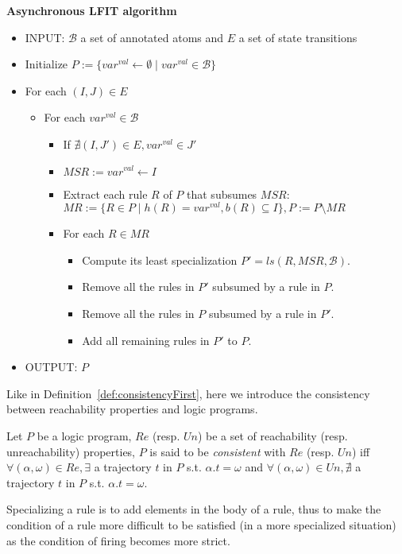 \textbf{Asynchronous LFIT algorithm}
\begin{itemize}
	\item INPUT: $\mathcal{B}$ a set of annotated atoms and $E$ a set of state transitions
	\item Initialize $P := \{var^{val} \leftarrow \emptyset \mid var^{val} \in \mathcal{B}\}$
	\item For each $(I,J) \in E$
	\begin{itemize}
		\item For each $var^{val} \in \mathcal{B}$
		\begin{itemize}
			\item If $\nexists (I,J') \in E, var^{val} \in J'$
			\item $MSR := var^{val} \leftarrow I$
			\item Extract each rule $R$ of $P$ that subsumes $MSR$: $MR := \{R \in P \mid h(R) = var^{val}, b(R) \subseteq I\}, P := P \setminus MR$
			\item For each $R \in MR$
			\begin{itemize}
				\item Compute its least specialization $P'=ls(R,MSR,\mathcal{B})$.
				\item Remove all the rules in $P'$ subsumed by a rule in $P$.
				\item Remove all the rules in $P$ subsumed by a rule in $P'$.
				\item Add all remaining rules in $P'$ to $P$.
			\end{itemize}
		\end{itemize}
	\end{itemize}
	\item OUTPUT: $P$
\end{itemize}

Like in Definition~\ref{def:consistencyFirst}, here we introduce the consistency between reachability properties and logic programs.

\begin{definition}
Let $P$ be a logic program, $Re$ (resp. $Un$) be a set of reachability (resp. unreachability) properties, $P$ is said to be {\em consistent} with $Re$ (resp. $Un$) iff
$\forall (\alpha,\omega) \in Re, \exists$ a trajectory $t$ in $P$ s.t. $\alpha.t=\omega$ and 
$\forall (\alpha,\omega) \in Un, \nexists$ a trajectory $t$ in $P$ s.t. $\alpha.t=\omega$.
\end{definition}

Specializing a rule is to add elements in the body of a rule,
thus to make the condition of a rule more difficult to be satisfied (in a more specialized situation) as the condition of firing becomes more strict.

